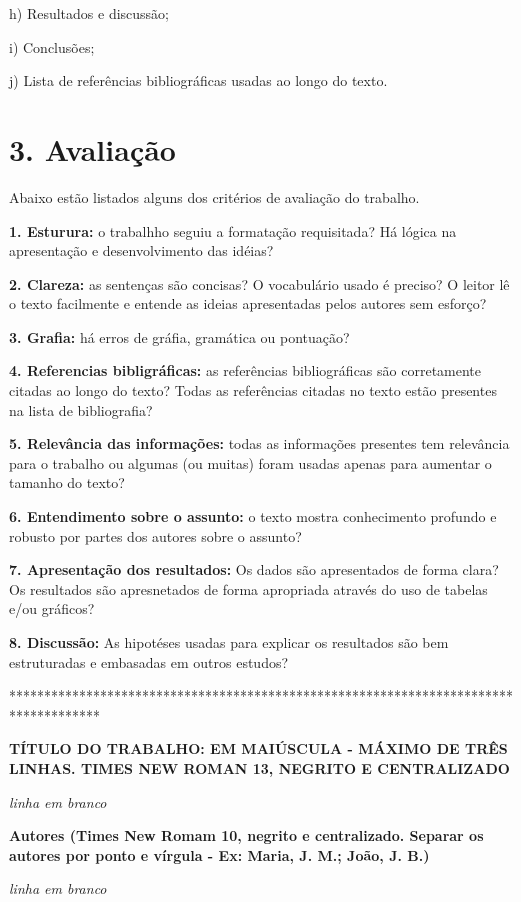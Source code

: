 \documentclass[a4paper,10pt]{article}
\begin{document}
    h) Resultados e discussão;
    
    i) Conclusões;
        
    j) Lista de referências bibliográficas usadas ao longo do texto. 
  
   \section* {3. Avaliação}
   \noindent
   
    Abaixo estão listados alguns dos critérios de avaliação do trabalho.
    
    \textbf{1. Esturura:} o trabalhho seguiu a formatação requisitada? Há lógica na apresentação e desenvolvimento das idéias? 
    
    \textbf{2. Clareza:} as sentenças são concisas? O vocabulário usado é preciso? O leitor lê o texto facilmente e entende as ideias apresentadas pelos autores sem esforço?
    
    \textbf{3. Grafia:} há erros de gráfia, gramática ou pontuação? 
    
    \textbf{4. Referencias bibligráficas:} as referências bibliográficas são corretamente citadas ao longo do texto? Todas as referências citadas no texto estão presentes na lista de bibliografia? 
    
    \textbf{5. Relevância das informações:} todas as informações presentes tem relevância para o trabalho ou algumas (ou muitas) foram usadas apenas para aumentar o tamanho do texto? 
    
    \textbf{6. Entendimento sobre o assunto:} o texto mostra conhecimento profundo e robusto por partes dos autores sobre o assunto? 
    
    \textbf{7. Apresentação dos resultados:} Os dados são apresentados de forma clara? Os resultados são apresnetados de forma apropriada através do uso de tabelas e/ou gráficos? 

    \textbf{8. Discussão:} As hipotéses usadas para explicar os resultados são bem estruturadas e embasadas em outros estudos? 
    
\vspace{10ex}

*************************************************************************************

  {\centering
  \textbf{TÍTULO DO TRABALHO: EM MAIÚSCULA - MÁXIMO DE TRÊS LINHAS. TIMES NEW ROMAN 13, NEGRITO E  CENTRALIZADO}
  
  \textit{linha em branco}
  
  \textbf{Autores (Times New Romam 10, negrito e centralizado. Separar os autores por ponto e vírgula - Ex: Maria, J. M.; João, J. B.)}
  
  \textit{linha em branco}
  
  \par
  }
  
\end{document}
